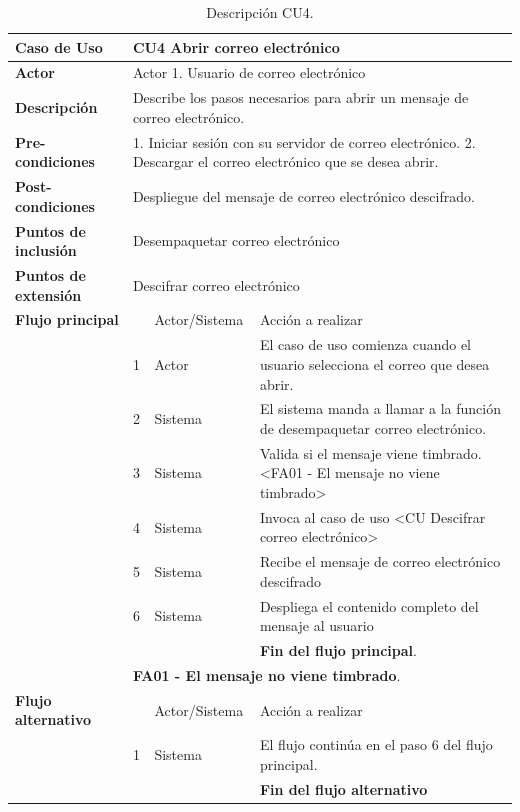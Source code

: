 \begin{table}[H]
\centering
   {
     \begin{tabular}{| p{} | p{} |p{4cm}|p{5cm}|}
     \hline
     \textbf{Caso de Uso} &\multicolumn{3}{|l|}{CU4 Abrir correo electrónico}\\
     \hline
     \textbf{Actor} & \multicolumn{3}{|l|}{Actor 1. Usuario de correo electrónico}\\
     \hline
     \textbf{Descripción} & \multicolumn{3}{|p{10cm}|}{Describe los pasos necesarios para abrir un mensaje de correo electrónico.}\\
     \hline
     \textbf{Pre-condiciones} & \multicolumn{3}{|p{10cm}|}{1. Iniciar sesión con su servidor de correo electrónico. 2. Descargar el correo electrónico que se desea abrir.}\\
     \hline
     \textbf{Post-condiciones} & \multicolumn{3}{|l|}{Despliegue del mensaje de correo electrónico descifrado.}\\
     \hline
     \textbf{Puntos de inclusión} & \multicolumn{3}{|l|}{Desempaquetar correo electrónico}\\
     \hline
     \textbf{Puntos de extensión} & \multicolumn{3}{|l|}{Descifrar correo electrónico}\\
     \hline
     \textbf{Flujo principal} & & Actor/Sistema & Acción a realizar\\
     \hline
     & 1 & Actor & El caso de uso comienza cuando el usuario selecciona el correo que desea abrir.\\
     \hline
     & 2 & Sistema & El sistema manda a llamar a la función de desempaquetar correo electrónico.\\
     \hline
     & 3 & Sistema & Valida si el mensaje viene timbrado. <FA01 - El mensaje no viene timbrado>\\
     \hline
     & 4 & Sistema & Invoca al caso de uso <CU Descifrar correo electrónico>\\
     \hline
     & 5 & Sistema & Recibe el mensaje de correo electrónico descifrado\\
     \hline
     & 6 & Sistema & Despliega el contenido completo del mensaje al usuario\\
     \hline
     & & & \textbf{Fin del flujo principal}.\\
     \hline
     & \multicolumn{3}{|l|}{\textbf{FA01 - El mensaje no viene timbrado}.}\\
     \hline
     \textbf{Flujo alternativo} & & Actor/Sistema & Acción a realizar\\
     \hline
     & 1 & Sistema & El flujo continúa en el paso 6 del flujo principal.\\
     \hline
     &  & & \textbf{Fin del flujo alternativo}\\
     
     \end{tabular}
    }
    \caption{Descripción CU4.}
    \label{tabla:CU4}
\end{table}


